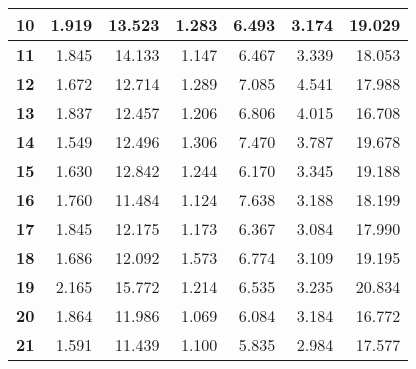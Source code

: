 \documentclass[12pt]{article}
\begin{document}
\begin{table}[!htbp]
{\begin{tabular}{crrrrr|r|}
\multicolumn{1}{|c|}{\textbf{10}} & \multicolumn{1}{r|}{1.919} & \multicolumn{1}{r|}{13.523} & \multicolumn{1}{r|}{1.283} & \multicolumn{1}{r|}{6.493} & 3.174 & 19.029 \\ \hline
\multicolumn{1}{|c|}{\textbf{11}} & \multicolumn{1}{r|}{1.845} & \multicolumn{1}{r|}{14.133} & \multicolumn{1}{r|}{1.147} & \multicolumn{1}{r|}{6.467} & 3.339 & 18.053 \\ \hline
\multicolumn{1}{|c|}{\textbf{12}} & \multicolumn{1}{r|}{1.672} & \multicolumn{1}{r|}{12.714} & \multicolumn{1}{r|}{1.289} & \multicolumn{1}{r|}{7.085} & 4.541 & 17.988 \\ \hline
\multicolumn{1}{|c|}{\textbf{13}} & \multicolumn{1}{r|}{1.837} & \multicolumn{1}{r|}{12.457} & \multicolumn{1}{r|}{1.206} & \multicolumn{1}{r|}{6.806} & 4.015 & 16.708 \\ \hline
\multicolumn{1}{|c|}{\textbf{14}} & \multicolumn{1}{r|}{1.549} & \multicolumn{1}{r|}{12.496} & \multicolumn{1}{r|}{1.306} & \multicolumn{1}{r|}{7.470} & 3.787 & 19.678 \\ \hline
\multicolumn{1}{|c|}{\textbf{15}} & \multicolumn{1}{r|}{1.630} & \multicolumn{1}{r|}{12.842} & \multicolumn{1}{r|}{1.244} & \multicolumn{1}{r|}{6.170} & 3.345 & 19.188 \\ \hline
\multicolumn{1}{|c|}{\textbf{16}} & \multicolumn{1}{r|}{1.760} & \multicolumn{1}{r|}{11.484} & \multicolumn{1}{r|}{1.124} & \multicolumn{1}{r|}{7.638} & 3.188 & 18.199 \\ \hline
\multicolumn{1}{|c|}{\textbf{17}} & \multicolumn{1}{r|}{1.845} & \multicolumn{1}{r|}{12.175} & \multicolumn{1}{r|}{1.173} & \multicolumn{1}{r|}{6.367} & 3.084 & 17.990 \\ \hline
\multicolumn{1}{|c|}{\textbf{18}} & \multicolumn{1}{r|}{1.686} & \multicolumn{1}{r|}{12.092} & \multicolumn{1}{r|}{1.573} & \multicolumn{1}{r|}{6.774} & 3.109 & 19.195 \\ \hline
\multicolumn{1}{|c|}{\textbf{19}} & \multicolumn{1}{r|}{2.165} & \multicolumn{1}{r|}{15.772} & \multicolumn{1}{r|}{1.214} & \multicolumn{1}{r|}{6.535} & 3.235 & 20.834 \\ \hline
\multicolumn{1}{|c|}{\textbf{20}} & \multicolumn{1}{r|}{1.864} & \multicolumn{1}{r|}{11.986} & \multicolumn{1}{r|}{1.069} & \multicolumn{1}{r|}{6.084} & 3.184 & 16.772 \\ \hline
\multicolumn{1}{|c|}{\textbf{21}} & \multicolumn{1}{r|}{1.591} & \multicolumn{1}{r|}{11.439} & \multicolumn{1}{r|}{1.100} & \multicolumn{1}{r|}{5.835} & 2.984 & 17.577 \\ \hline

\end{tabular}}
\end{table}
\end{document}
